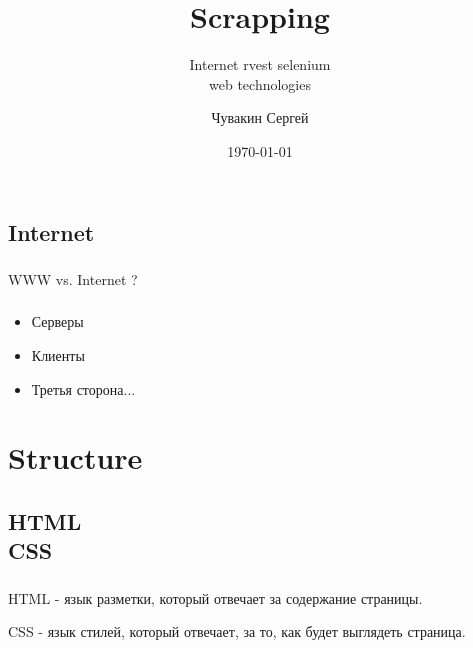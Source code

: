 \documentclass[t, 11pt]{beamer}
\title{Scrapping}
\subtitle{Internet rvest selenium \\ web technologies}
\author{Чувакин Сергей}
\date{\today}
\institute{R meetup}
\begin{document}
	\frame[plain]{\titlepage}
%	
%			 
%	

\subsection{Internet}
\begin{frame}
	\frametitle{\insertsection}
	\frametitle{\insertsubsection}  
		WWW vs. Internet ?
\end{frame}

\begin{frame}
	\frametitle{\insertsection}
	\frametitle{\insertsubsection}  
	\begin{itemize}
		\item Серверы 
		\item Клиенты
		\item Третья сторона...
	\end{itemize}
\end{frame}

\section{Structure}
\subsection{HTML\\CSS}
\begin{frame}
	\frametitle{\insertsection}
	\frametitle{\insertsubsection}  
	HTML - язык разметки, который отвечает за содержание страницы. 
	
	
	CSS - язык стилей, который отвечает, за то, как будет выглядеть страница.  

\end{frame}
\end{document}
